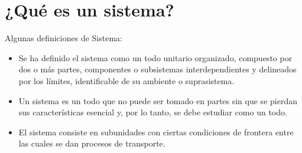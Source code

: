 \section{¿Qué es un sistema?}

Algunas definiciones de Sistema: \cite{sistema}
\\
\begin{itemize}
    \item Se ha definido el sistema como un todo unitario organizado, compuesto por dos o más partes, componentes o subsistemas interdependientes y delineados por los límites, identificable de su ambiente o suprasistema.

    \item Un sistema es un todo que no puede ser tomado en partes sin que se pierdan sus características esencial y, por lo tanto, se debe estudiar como un todo.

    \item El sistema consiste en subunidades con ciertas condiciones de frontera entre las cuales se dan procesos de transporte.
\end{itemize}